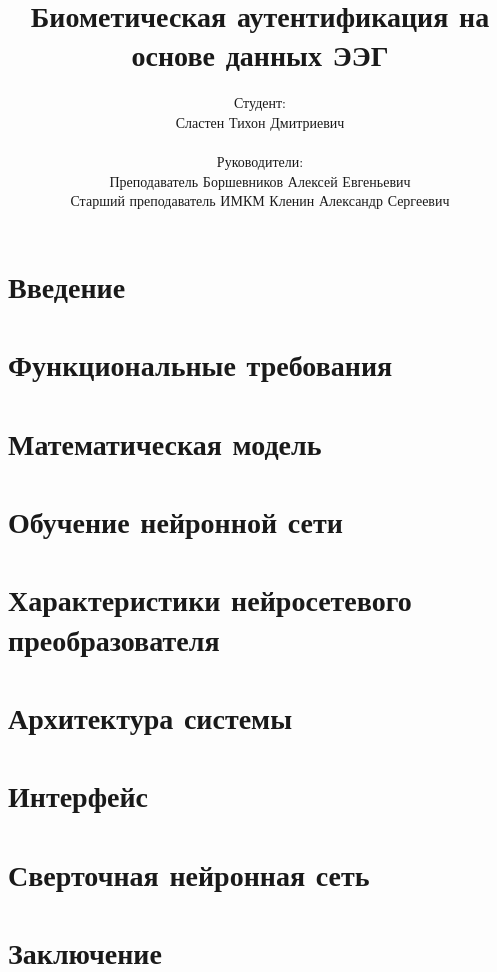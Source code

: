 \documentclass{beamer}
\title{Биометическая аутентификация на основе данных ЭЭГ}
\author{
    Студент: \\ Сластен Тихон Дмитриевич \\ \\
    Руководители: \\ Преподаватель Боршевников Алексей Евгеньевич \\ Старший преподаватель ИМКМ Кленин Александр Сергеевич}
\institute{Б8303а Прикладная математика и информатика}
\date{}
\begin{document}
\maketitle

\section{Введение}





\section{Функциональные требования}



\section{Математическая модель}





\section{Обучение нейронной сети}



\section{Характеристики нейросетевого преобразователя}


\section{Архитектура системы}



\section{Интерфейс}



\section{Сверточная нейронная сеть}




\section{Заключение}

% 
\end{document}
